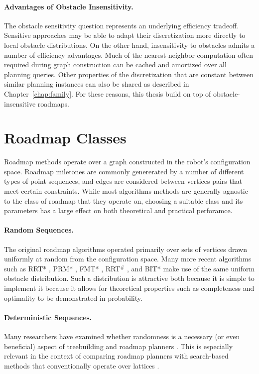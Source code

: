 \paragraph{Advantages of Obstacle Insensitivity.}
The obstacle sensitivity question represents an underlying efficiency
tradeoff.
Sensitive approaches may be able to adapt their discretization more
directly to local obstacle distributions.
On the other hand,
insensitivity to obstacles admits a number of efficiency advantages.
Much of the nearest-neighbor computation
often required during graph construction can be cached and amortized
over all planning queries.
Other properties of the discretization that are constant between
similar planning instances can also be shared
as described in Chapter~\ref{chap:family}.
For these reasons,
this thesis build on top of obstacle-insensitive roadmaps.

\section{Roadmap Classes}
\label{sec:roadmaps:roadmap-classes}

Roadmap methods operate over a graph constructed in the
robot's configuration space.
Roadmap miletones are commonly genererated by a number of different
types of point sequences,
and edges are considered between vertices pairs that meet
certain constraints.
While most algorithms methods are generally agnostic
to the class of roadmap that they operate on,
choosing a suitable class and its parameters has a large effect
on both theoretical and practical perforamce.

\paragraph{Random Sequences.}
The original roadmap algorithms
\citep{kavrakietal1996prm}
operated primarily over sets
of vertices drawn uniformly at random from the configuration space.
Many more recent algorithms such as
RRT* \citep{karaman2010rrtstar},
PRM* \citep{karaman2011samplingoptimal},
FMT* \citep{janson2015fmtstar},
RRT$^{\#}$ \citep{arslan2013rrtsharp},
and BIT* \citep{gammell2015bitstar} make use of the same
uniform obstacle distribution.
Such a distribution is attractive both because
it is simple to implement
it because it allows for theoretical properties such as
completeness and optimality to be demonstrated
in probability.

\paragraph{Deterministic Sequences.}
Many researchers have examined whether randomness is a necessary
(or even beneficial) aspect of treebuilding and roadmap planners
\citep{branicky2002detvsprobroadmaps}.
This is especially relevant in the context of comparing
roadmap planners with search-based methods
that conventionally operate over lattices \citep{lavalle2002gridprms}.

